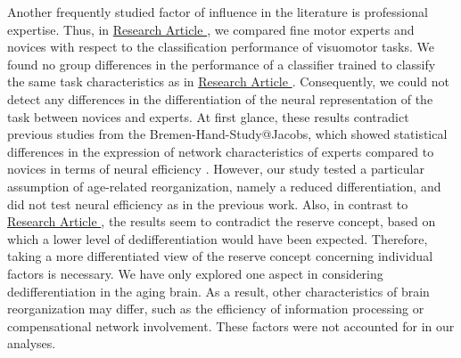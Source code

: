 Another frequently studied factor of influence in the literature is professional expertise. Thus, in \hyperref[results:paperIV]{Research Article }, we compared fine motor experts and novices with respect to the classification performance of visuomotor tasks. We found no group differences in the performance of a classifier trained to classify the same task characteristics as in \hyperref[results:paperI]{Research Article }. Consequently, we could not detect any differences in the differentiation of the neural representation of the task between novices and experts. At first glance, these results contradict previous studies from the Bremen-Hand-Study@Jacobs, which showed statistical differences in the expression of network characteristics of experts compared to novices in terms of neural efficiency \cite{Goelz2018, Vieluf2018}. However, our study tested a particular assumption of age-related reorganization, namely a reduced differentiation, and did not test neural efficiency as in the previous work. Also, in contrast to \hyperref[results:paperIII]{Research Article }, the results seem to contradict the reserve concept, based on which a lower level of dedifferentiation would have been expected. Therefore, taking a more differentiated view of the reserve concept concerning individual factors is necessary. We have only explored one aspect in considering dedifferentiation in the aging brain. As a result, other characteristics of brain reorganization may differ, such as the efficiency of information processing or compensational network involvement. These factors were not accounted for in our analyses.

